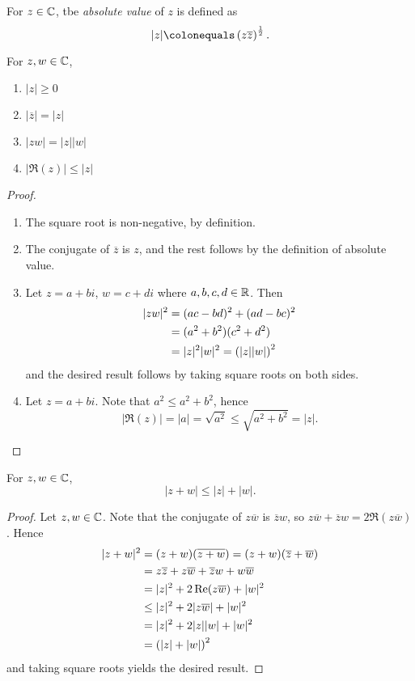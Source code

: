 For $z\in\mathbb C$, tbe \emph{absolute value} of $z$ is defined as
\[|z|\colonequals\brac{z\overline{z}}^\frac{1}{2}.\]

\begin{lemma}
For $z,w\in\mathbb C$,
\begin{enumerate}[label=(\roman*)]
\item $|z|\ge0$
\item $|\overline{z}|=|z|$
\item $|zw|=|z||w|$
\item $|\Re(z)|\le|z|$
\end{enumerate}
\end{lemma}

\begin{proof} \
\begin{enumerate}[label=(\roman*)]
\item The square root is non-negative, by definition.
\item The conjugate of $\overline{z}$ is $z$, and the rest follows by the definition of absolute value.
\item Let $z=a+bi$, $w=c+di$ where $a,b,c,d\in\mathbb R$. Then
\begin{align*}
|zw|^2&=(ac-bd)^2+(ad-bc)^2\\
&=(a^2+b^2)(c^2+d^2)\\
&=|z|^2|w|^2=\left(|z||w|\right)^2
\end{align*}
and the desired result follows by taking square roots on both sides.
\item Let $z=a+bi$. Note that $a^2\le a^2+b^2$, hence
\[|\Re(z)|=|a|=\sqrt{a^2}\le\sqrt{a^2+b^2}=|z|.\]
\end{enumerate}
\end{proof}

\begin{proposition}
For $z,w\in\mathbb C$,
\begin{equation}
|z+w|\le|z|+|w|.
\end{equation}
\end{proposition}

\begin{proof}
Let $z,w\in\mathbb C$. Note that the conjugate of $z\overline{w}$ is $\overline{z}w$, so $z\overline{w}+\overline{z}w=2\Re(z\overline{w})$. Hence
\begin{align*}
|z+w|^2&=(z+w)(\overline{z+w})=(z+w)(\overline{z}+\overline{w})\\
&=z\overline{z}+z\overline{w}+\overline{z}w+w\overline{w}\\
&=|z|^2+2\Re(z\overline{w})+|w|^2\\
&\le|z|^2+2|z\overline{w}|+|w|^2\\
&=|z|^2+2|z||w|+|w|^2\\
&=\left(|z|+|w|\right)^2
\end{align*}
and taking square roots yields the desired result.
\end{proof}

